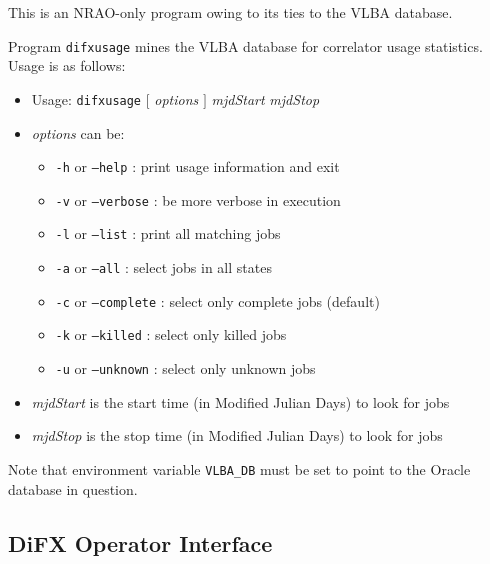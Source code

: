 This is an NRAO-only program owing to its ties to the VLBA database.

Program {\tt difxusage} mines the VLBA database for correlator usage statistics.
Usage is as follows:

\begin{itemize}
\item[] Usage: {\tt difxusage} $[$ {\em options} $]$ {\em mjdStart} {\em mjdStop}
\item[] {\em options} can be:
\begin{itemize}
\item[] {\tt -h} or {\tt --help} : print usage information and exit
\item[] {\tt -v} or {\tt --verbose} : be more verbose in execution
\item[] {\tt -l} or {\tt --list} : print all matching jobs
\item[] {\tt -a} or {\tt --all} : select jobs in all states
\item[] {\tt -c} or {\tt --complete} : select only complete jobs (default)
\item[] {\tt -k} or {\tt --killed} : select only killed jobs
\item[] {\tt -u} or {\tt --unknown} : select only unknown jobs
\end{itemize}
\item[] {\em mjdStart} is the start time (in Modified Julian Days) to look for jobs
\item[] {\em mjdStop} is the stop time (in Modified Julian Days) to look for jobs
\end{itemize}

\noindent
Note that environment variable {\tt VLBA\_DB} must be set to point to the Oracle database in question.







\subsection{DiFX Operator Interface} \label{sec:doi}

